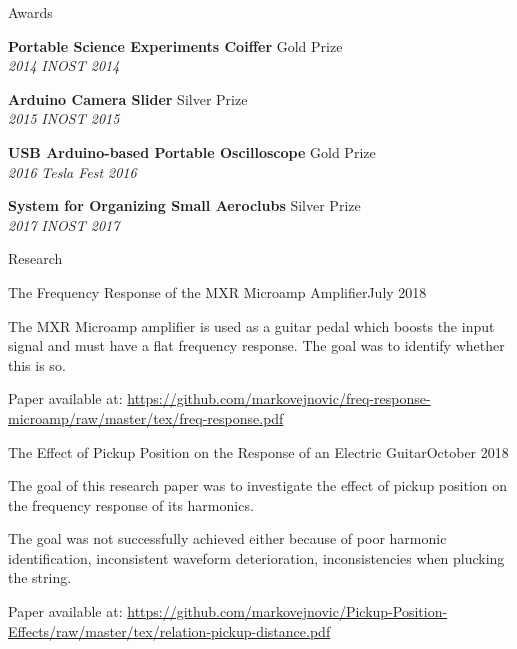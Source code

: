 \documentclass{resume}
\begin{document}
\begin{rSection}{Awards}

{\bf Portable Science Experiments Coiffer} \hfill {Gold Prize}\\
{\em 2014} \hfill {\em INOST 2014}

{\bf Arduino Camera Slider} \hfill {Silver Prize}\\
{\em 2015} \hfill {\em INOST 2015}

{\bf USB Arduino-based Portable Oscilloscope} \hfill {Gold Prize}\\
{\em 2016} \hfill {\em Tesla Fest 2016}

{\bf System for Organizing Small Aeroclubs} \hfill {Silver Prize}\\
{\em 2017} \hfill {\em INOST 2017}

\end{rSection}

\begin{rSection}{Research}

\begin{rSubsection}{The Frequency Response of the MXR Microamp Amplifier}{July 2018}{}{}
\item The MXR Microamp amplifier is used as a guitar pedal which boosts the input signal and must have a flat frequency response. The goal was to identify whether this is so.
\item Paper available at: \url{https://github.com/markovejnovic/freq-response-microamp/raw/master/tex/freq-response.pdf}
\end{rSubsection}

\begin{rSubsection}{The Effect of Pickup Position on the Response of an Electric Guitar}{October 2018}{}{}
\item The goal of this research paper was to investigate the effect of pickup position on the frequency response of its harmonics.
\item The goal was not successfully achieved either because of poor harmonic identification, inconsistent waveform deterioration, inconsistencies when plucking the string.
\item Paper available at: \url{https://github.com/markovejnovic/Pickup-Position-Effects/raw/master/tex/relation-pickup-distance.pdf}
\end{rSubsection}

\end{rSection}
\end{document}
